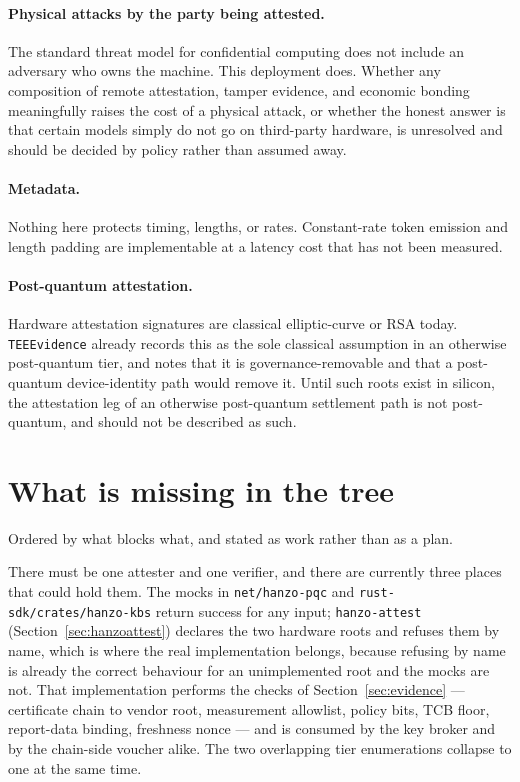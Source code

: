 \documentclass[11pt]{article}
\newcommand{\code}[1]{\texttt{#1}}
\begin{document}
\paragraph{Physical attacks by the party being attested.}
The standard threat model for confidential computing does not include an adversary who owns the
machine. This deployment does. Whether any composition of remote attestation, tamper evidence, and
economic bonding meaningfully raises the cost of a physical attack, or whether the honest answer is
that certain models simply do not go on third-party hardware, is unresolved and should be decided by
policy rather than assumed away.

\paragraph{Metadata.}
Nothing here protects timing, lengths, or rates. Constant-rate token emission and length padding are
implementable at a latency cost that has not been measured.

\paragraph{Post-quantum attestation.}
Hardware attestation signatures are classical elliptic-curve or RSA today. \code{TEEEvidence}
already records this as the sole classical assumption in an otherwise post-quantum tier, and notes
that it is governance-removable and that a post-quantum device-identity path would remove it. Until
such roots exist in silicon, the attestation leg of an otherwise post-quantum settlement path is not
post-quantum, and should not be described as such.

\section{What is missing in the tree}

Ordered by what blocks what, and stated as work rather than as a plan.

There must be one attester and one verifier, and there are currently three places that could hold
them. The mocks in \code{net/hanzo-pqc} and \code{rust-sdk/crates/hanzo-kbs} return success for any
input; \code{hanzo-attest} (Section~\ref{sec:hanzoattest}) declares the two hardware roots and
refuses them by name, which is where the real implementation belongs, because refusing by name is
already the correct behaviour for an unimplemented root and the mocks are not. That implementation
performs the checks of Section~\ref{sec:evidence} --- certificate chain to vendor root, measurement
allowlist, policy bits, TCB floor, report-data binding, freshness nonce --- and is consumed by the
key broker and by the chain-side voucher alike. The two overlapping tier enumerations collapse to one
at the same time.
\end{document}
